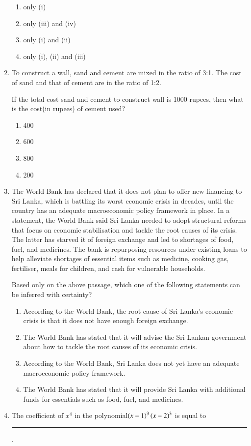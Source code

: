 \documentclass[journal,12pt,onecolumn]{IEEEtran}
\theoremstyle{remark}
\begin{document}
\begin{enumerate}
\hfill{}
\begin{enumerate}
    \item only (i)
    \item only (iii) and (iv)
    \item only (i) and (ii)
    \item only (i), (ii) and (iii)
\end{enumerate}

    \item To construct a wall, sand and cement are mixed in the ratio of 3:1. The cost of sand and that of cement are in the ratio of 1:2.

    If the total cost sand and cement to construct wall is 1000 rupees, then what is the cost(in rupees) of cement used?
    
\hfill{}
\begin{enumerate}
    \item 400
    \item 600
    \item 800
    \item 200
\end{enumerate}

    \item The World Bank has declared that it does not plan to offer new financing to Sri Lanka, which is battling its worst economic crisis in decades, until the country has an adequate macroeconomic policy framework in place. In a statement, the World Bank said Sri Lanka needed to adopt structural reforms that focus on economic stabilisation and tackle the root causes of its crisis. The latter has starved it of foreign exchange and led to shortages of food, fuel, and medicines. The bank is repurposing resources under existing loans to help alleviate shortages of essential items such as medicine, cooking gas, fertiliser, meals for children, and cash for vulnerable households.

    Based only on the above passage, which one of the following statements can  be inferred with certainty?
    
\hfill{}
\begin{enumerate}
    \item According to the World Bank, the root cause of Sri Lanka’s economic crisis is that it does not have enough foreign exchange.
    \item The World Bank has stated that it will advise the Sri Lankan government about how to tackle the root causes of its economic crisis.
    \item According to the World Bank, Sri Lanka does not yet have an adequate macroeconomic policy framework.
    \item The World Bank has stated that it will provide Sri Lanka with additional funds for essentials such as food, fuel, and medicines.
\end{enumerate}
\newpage
    \item The coefficient of $x^4$ in the polynomial$ \left(x - 1\right)^3\left(x - 2\right)^3$ is equal to \rule{40pt}{0.1mm}.
    

\end{enumerate}
\end{document}
